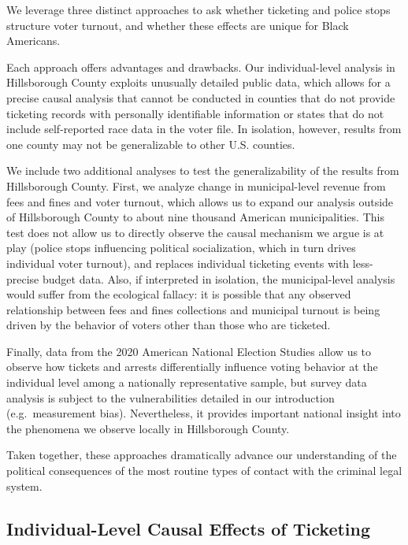 \documentclass[
  12pt,
]{article}
\begin{document}
We leverage three distinct approaches to ask whether ticketing and police stops structure voter turnout, and whether these effects are unique for Black Americans.

Each approach offers advantages and drawbacks. Our individual-level analysis in Hillsborough County exploits unusually detailed public data, which allows for a precise causal analysis that cannot be conducted in counties that do not provide ticketing records with personally identifiable information or states that do not include self-reported race data in the voter file. In isolation, however, results from one county may not be generalizable to other U.S. counties.

We include two additional analyses to test the generalizability of the results from Hillsborough County. First, we analyze change in municipal-level revenue from fees and fines and voter turnout, which allows us to expand our analysis outside of Hillsborough County to about nine thousand American municipalities. This test does not allow us to directly observe the causal mechanism we argue is at play (police stops influencing political socialization, which in turn drives individual voter turnout), and replaces individual ticketing events with less-precise budget data. Also, if interpreted in isolation, the municipal-level analysis would suffer from the ecological fallacy: it is possible that any observed relationship between fees and fines collections and municipal turnout is being driven by the behavior of voters other than those who are ticketed.

Finally, data from the 2020 American National Election Studies allow us to observe how tickets and arrests differentially influence voting behavior at the individual level among a nationally representative sample, but survey data analysis is subject to the vulnerabilities detailed in our introduction (e.g.~measurement bias). Nevertheless, it provides important national insight into the phenomena we observe locally in Hillsborough County.

Taken together, these approaches dramatically advance our understanding of the political consequences of the most routine types of contact with the criminal legal system.

\hypertarget{individual-level-causal-effects-of-ticketing}{%
\subsection*{Individual-Level Causal Effects of Ticketing}\label{individual-level-causal-effects-of-ticketing}}
\end{document}
